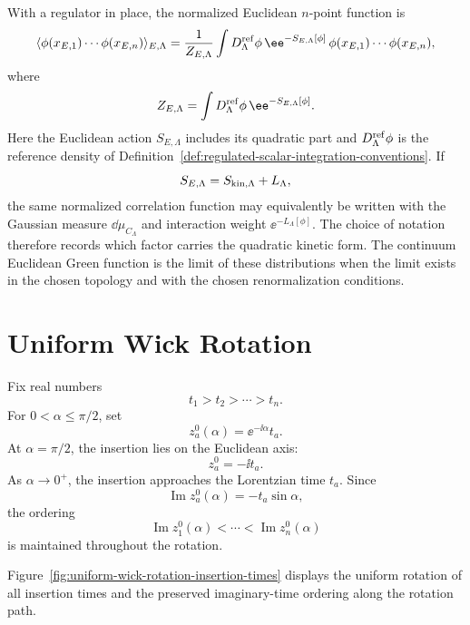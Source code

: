 \begin{definition}
\label{def:regulated-euclidean-scalar-green-function}
With a regulator in place, the normalized Euclidean \(n\)-point function is
\[
  \langle\phi(x_{E,1})\cdots\phi(x_{E,n})\rangle_{E,\Lambda}
  =
  \frac{1}{Z_{E,\Lambda}}
  \int D_\Lambda^{\rm ref}\phi\,
  \ee^{-S_{E,\Lambda}[\phi]}\,
  \phi(x_{E,1})\cdots\phi(x_{E,n}),
\]
where
\[
  Z_{E,\Lambda}
  =
  \int D_\Lambda^{\rm ref}\phi\,
  \ee^{-S_{E,\Lambda}[\phi]}.
\]
Here the Euclidean action \(S_{E,\Lambda}\) includes its quadratic part and
\(D_\Lambda^{\rm ref}\phi\) is the reference density of
Definition~\ref{def:regulated-scalar-integration-conventions}.  If
\[
  S_{E,\Lambda}=S_{\rm kin,\Lambda}+L_\Lambda ,
\]
the same normalized correlation function may equivalently be written with the
Gaussian measure \(\dd\mu_{C_\Lambda}\) and interaction weight
\(\ee^{-L_\Lambda[\phi]}\).  The choice of notation therefore records which
factor carries the quadratic kinetic form.
The continuum Euclidean Green function is the limit of these distributions
when the limit exists in the chosen topology and with the chosen
renormalization conditions.
\end{definition}

\section{Uniform Wick Rotation}

\begin{definition}
\label{def:uniform-wick-rotation-path}
Fix real numbers
\[
  t_1>t_2>\cdots>t_n.
\]
For \(0<\alpha\le\pi/2\), set
\[
  z_a^0(\alpha)=\ee^{-\ii\alpha}t_a.
\]
At \(\alpha=\pi/2\), the insertion lies on the Euclidean axis:
\[
  z_a^0=-\ii t_a.
\]
As \(\alpha\to0^+\), the insertion approaches the Lorentzian time \(t_a\).
Since
\[
  \operatorname{Im}z_a^0(\alpha)=-t_a\sin\alpha,
\]
the ordering
\[
  \operatorname{Im}z_1^0(\alpha)
  <
  \cdots
  <
  \operatorname{Im}z_n^0(\alpha)
\]
is maintained throughout the rotation.
\end{definition}

Figure~\ref{fig:uniform-wick-rotation-insertion-times} displays the uniform
rotation of all insertion times and the preserved imaginary-time ordering along
the rotation path.

